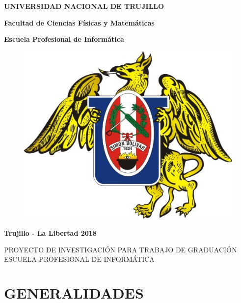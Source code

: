 \documentclass[a4paper, 12pt]{article}
\begin{document}
\begin{center}
 {\bf {\fontsize{14}{16.8}\selectfont UNIVERSIDAD NACIONAL DE TRUJILLO}}     
 
    {\bf{\fontsize{14}{16.8}\selectfont Facultad de Ciencias Físicas y Matemáticas}} 

  {\bf{\fontsize{14}{16.8}\selectfont Escuela Profesional de Informática}}
\end{center}  

\begin{figure}[ht]
\begin{center}
\includegraphics[width=.3\textwidth]{unt}
\end{center}
\end{figure}

\vskip 2cm
\begin{center}
  { \bf {\fontsize{17}{20.4}\selectfont{Predicción de la respuesta correcta de una pregunta de opción múltiple mediante técnicas de aprendizaje no supervisado asociado con la experiencia.}  } } 
\end{center}   
  \vskip 1cm
  { \bf {\fontsize{17}{20.4}}  } 
  \vskip 1cm
  { \bf {\fontsize{17}{20.4}}  } 
\vskip 4cm
\begin{center}    
{\bf {\fontsize{14}{16.8}\selectfont Trujillo - La Libertad
\vskip 0.0cm
\hspace*{-0.2cm} 
\vskip 0.1cm
2018 }}
\end{center} 
\newpage

\begin{center}
\Large {PROYECTO DE INVESTIGACIÓN PARA TRABAJO DE GRADUACIÓN \\
\vskip 0.2cm
 ESCUELA PROFESIONAL DE INFORMÁTICA}
\end{center}
\vskip 1cm

\section{GENERALIDADES}
\end{document}
